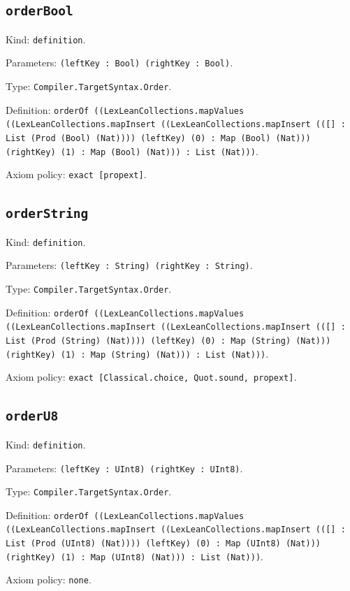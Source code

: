 \documentclass[11pt]{article}
\begin{document}
\subsection*{\texttt{orderBool}}
\noindent Kind: \texttt{definition}.\par
\noindent Parameters: \texttt{(leftKey : Bool) (rightKey : Bool)}.\par
\noindent Type: \texttt{Compiler.TargetSyntax.Order}.\par
\noindent Definition: \texttt{orderOf ((LexLeanCollections.mapValues ((LexLeanCollections.mapInsert ((LexLeanCollections.mapInsert (([] : List (Prod (Bool) (Nat)))) (leftKey) (0) : Map (Bool) (Nat))) (rightKey) (1) : Map (Bool) (Nat))) : List (Nat)))}.\par
\noindent Axiom policy: \texttt{exact [propext]}.\par
\subsection*{\texttt{orderString}}
\noindent Kind: \texttt{definition}.\par
\noindent Parameters: \texttt{(leftKey : String) (rightKey : String)}.\par
\noindent Type: \texttt{Compiler.TargetSyntax.Order}.\par
\noindent Definition: \texttt{orderOf ((LexLeanCollections.mapValues ((LexLeanCollections.mapInsert ((LexLeanCollections.mapInsert (([] : List (Prod (String) (Nat)))) (leftKey) (0) : Map (String) (Nat))) (rightKey) (1) : Map (String) (Nat))) : List (Nat)))}.\par
\noindent Axiom policy: \texttt{exact [Classical.choice, Quot.sound, propext]}.\par
\subsection*{\texttt{orderU8}}
\noindent Kind: \texttt{definition}.\par
\noindent Parameters: \texttt{(leftKey : UInt8) (rightKey : UInt8)}.\par
\noindent Type: \texttt{Compiler.TargetSyntax.Order}.\par
\noindent Definition: \texttt{orderOf ((LexLeanCollections.mapValues ((LexLeanCollections.mapInsert ((LexLeanCollections.mapInsert (([] : List (Prod (UInt8) (Nat)))) (leftKey) (0) : Map (UInt8) (Nat))) (rightKey) (1) : Map (UInt8) (Nat))) : List (Nat)))}.\par
\noindent Axiom policy: \texttt{none}.\par
\end{document}
